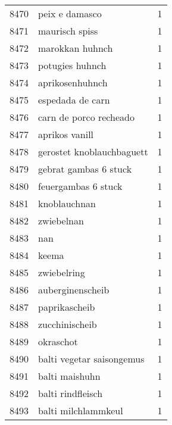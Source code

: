 \begin{tabular}{llr}
8470 &                                     peix e damasco &      1 \\
8471 &                                     maurisch spiss &      1 \\
8472 &                                    marokkan huhnch &      1 \\
8473 &                                    potugies huhnch &      1 \\
8474 &                                    aprikosenhuhnch &      1 \\
8475 &                                   espedada de carn &      1 \\
8476 &                             carn de porco recheado &      1 \\
8477 &                                     aprikos vanill &      1 \\
8478 &                          gerostet knoblauchbaguett &      1 \\
8479 &                              gebrat gambas 6 stuck &      1 \\
8480 &                                feuergambas 6 stuck &      1 \\
8481 &                                       knoblauchnan &      1 \\
8482 &                                         zwiebelnan &      1 \\
8483 &                                                nan &      1 \\
8484 &                                              keema &      1 \\
8485 &                                        zwiebelring &      1 \\
8486 &                                   auberginenscheib &      1 \\
8487 &                                      paprikascheib &      1 \\
8488 &                                     zucchinischeib &      1 \\
8489 &                                          okraschot &      1 \\
8490 &                          balti vegetar saisongemus &      1 \\
8491 &                                     balti maishuhn &      1 \\
8492 &                                  balti rindfleisch &      1 \\
8493 &                                balti milchlammkeul &      1 \\

\end{tabular}
